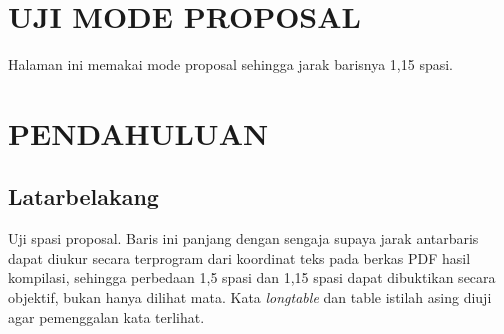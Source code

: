 \documentclass[jenis=prototipe,mode=proposal,jenjang=diploma,sitasi=ieee,logo=logo-placeholder]{unnes-ta}
\begin{document}
\bagianawal
\chapter*{UJI MODE PROPOSAL}
Halaman ini memakai mode proposal sehingga jarak barisnya 1,15 spasi.

\bagianutama
\chapter{PENDAHULUAN}
\section{Latarbelakang}
Uji spasi proposal. Baris ini panjang dengan sengaja supaya jarak antarbaris dapat diukur
secara terprogram dari koordinat teks pada berkas PDF hasil kompilasi, sehingga perbedaan
1,5 spasi dan 1,15 spasi dapat dibuktikan secara objektif, bukan hanya dilihat mata.
Kata \textit{longtable} dan table istilah asing diuji agar pemenggalan kata terlihat.
\end{document}
